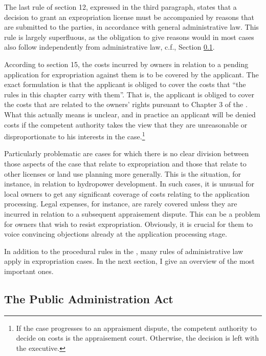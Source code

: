 The last rule of section 12, expressed in the third paragraph, states that a decision to grant an expropriation license must be accompanied by reasons that are submitted to the parties, in accordance with general administrative law. This rule is largely superfluous, as the obligation to give reasons would in most cases also follow independently from administrative law, c.f., Section \ref{sec:paa67}.

According to section 15, the costs incurred by owners in relation to a pending application for expropriation against them is to be covered by the applicant. The exact formulation is that the applicant is obliged to cover the costs that ``the rules in this chapter carry with them''. That is, the applicant is obliged to cover the costs that are related to the owners' rights pursuant to Chapter 3 of the \cite{ea59}. What this actually means is unclear, and in practice an applicant will be denied costs if the competent authority takes the view that they are unreasonable or disproportionate to his interests in the case.\footnote{If the case progresses to an appraisment dispute, the competent authority to decide on costs is the appraisement court. Otherwise, the decision is left with the executive.}

Particularly problematic are cases for which there is no clear division between those aspects of the case that relate to expropriation and those that relate to other licenses or land use planning more generally. This is the situation, for instance, in relation to hydropower development. In such cases, it is unusual for local owners to get any significant coverage of costs relating to the application processing. Legal expenses, for instance, are rarely covered unless they are incurred in relation to a subsequent appraisement dispute. This can be a problem for owners that wish to resist expropriation. Obviously, it is crucial for them to voice convincing objections already at the application processing stage.

In addition to the procedural rules in the \cite{ea59}, many rules of administrative law apply in expropriation cases. In the next section, I give an overview of the most important ones.

\subsection{The Public Administration Act}\label{sec:paa67}

